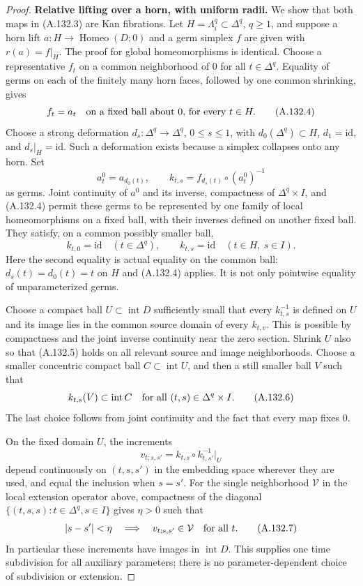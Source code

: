 \begin{proof}
\smallskip\noindent
\textbf{Relative lifting over a horn, with uniform radii.}
We show that both maps in (A.132.3) are Kan fibrations. Let
$H=\Lambda_i^q\subset\Delta^q$, $q\geq1$, and suppose a horn
lift $a:H\to\operatorname{Homeo}(D;0)$ and a germ simplex $f$
are given with $r(a)=f|_H$. The proof for global homeomorphisms
is identical. Choose a representative $f_t$ on a common neighborhood
of $0$ for all $t\in\Delta^q$. Equality of germs on each of the
finitely many horn faces, followed by one common shrinking, gives
\[
 f_t=a_t\quad\hbox{on a fixed ball about $0$, for every }t\in H.
                                                        \tag{A.132.4}
\]
Choose a strong deformation $d_s:\Delta^q\to\Delta^q$, $0\leq s\leq1$,
with $d_0(\Delta^q)\subset H$, $d_1=\mathrm{id}$, and
$d_s|_H=\mathrm{id}$. Such a deformation exists because a simplex
collapses onto any horn. Set
\[
 a^0_t=a_{d_0(t)},\qquad
 k_{t,s}=f_{d_s(t)}\circ(a^0_t)^{-1}
\]
as germs. Joint continuity of $a^0$ and its inverse, compactness of
$\Delta^q\times I$, and (A.132.4) permit these germs to be
represented by one family of local homeomorphisms on a fixed ball,
with their inverses defined on another fixed ball. They satisfy,
on a common possibly smaller ball,
\[
 k_{t,0}=\mathrm{id}\quad(t\in\Delta^q),\qquad
 k_{t,s}=\mathrm{id}\quad(t\in H,\ s\in I).
                                                        \tag{A.132.5}
\]
Here the second equality is actual equality on the common ball:
$d_s(t)=d_0(t)=t$ on $H$ and (A.132.4) applies. It is not only
pointwise equality of unparameterized germs.

Choose a compact ball $U\subset\operatorname{int}D$ sufficiently
small that every $k_{t,s}^{-1}$ is defined on $U$ and its image
lies in the common source domain of every $k_{t,v}$.
This is possible by compactness and the joint inverse continuity
near the zero section. Shrink $U$ also so that (A.132.5) holds
on all relevant source and image neighborhoods. Choose a smaller
concentric compact ball $C\subset\operatorname{int}U$, and then
a still smaller ball $V$ such that
\[
 k_{t,s}(V)\subset\operatorname{int}C
 \quad\hbox{for all }(t,s)\in\Delta^q\times I.
                                                        \tag{A.132.6}
\]
The last choice follows from joint continuity and the fact that
every map fixes $0$.

On the fixed domain $U$, the increments
\[
 v_{t;s,s'}=k_{t,s}\circ k_{t,s'}^{-1}|_U
\]
depend continuously on $(t,s,s')$ in the embedding space wherever
they are used, and equal the inclusion when $s=s'$.
For the single neighborhood $\mathcal V$ in the local extension
operator above, compactness of the diagonal
$\{(t,s,s):t\in\Delta^q,s\in I\}$ gives $\eta>0$ such that
\[
 |s-s'|<\eta\quad\Longrightarrow\quad
 v_{t;s,s'}\in\mathcal V
 \quad\hbox{for all }t.
                                                        \tag{A.132.7}
\]
In particular these increments have images in $\operatorname{int}D$.
This supplies one time subdivision for all auxiliary parameters;
there is no parameter-dependent choice of subdivision or extension.


\end{proof}

